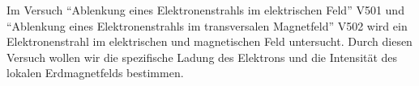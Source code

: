 

Im Versuch \enquote{Ablenkung eines Elektronenstrahls im elektrischen Feld} V501 und \enquote{Ablenkung eines Elektronenstrahls im transversalen Magnetfeld} V502 wird ein Elektronenstrahl im elektrischen und magnetischen Feld untersucht. Durch diesen Versuch wollen wir die spezifische Ladung des Elektrons und die Intensität des lokalen Erdmagnetfelds bestimmen.
